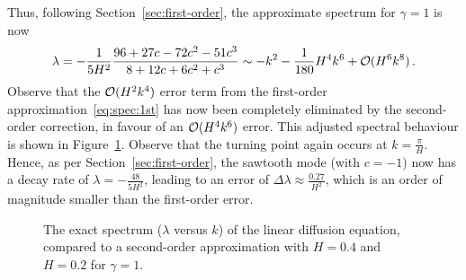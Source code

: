 \documentclass[12pt,a5paper]{article}
\begin{document}
Thus, following Section~\ref{sec:first-order}, the approximate spectrum for $\gamma=1$ is now
\begin{eqnarray}
\lambda = -\frac{1}{5H^2}\frac{96+27c-72c^2-51c^3}{8+12c+6c^2+c^3}
\sim -k^2-\frac{1}{180}H^4k^6+{\cal O}(H^6k^8)\,.
\end{eqnarray}
Observe that the ${\cal O}(H^2k^4)$ error term from the first-order approximation~\eqref{eq:spec:1st} has now been
completely eliminated by the second-order correction, in favour of an ${\cal O}(H^4k^6)$ error. 
This adjusted spectral behaviour is shown in Figure~\ref{fig:spec:2nd-order}.
Observe that the turning point again occurs at $k=\frac{\pi}{H}$. Hence,
as per Section~\ref{sec:first-order},
the sawtooth mode (with $c=-1$) now has a decay rate of $\lambda=-\frac{48}{5H^2}$, leading to an error of
$\Delta\lambda\approx\frac{0.27}{H^2}$, which is an order of magnitude smaller than the first-order error.
\begin{figure}[hbt]
\centering
\caption{The exact spectrum ($\lambda$ versus $k$) of the linear diffusion equation, compared to a second-order approximation with $H=0.4$ and $H=0.2$ for $\gamma=1$.}
\label{fig:spec:2nd-order}
\end{figure}

\end{document}
